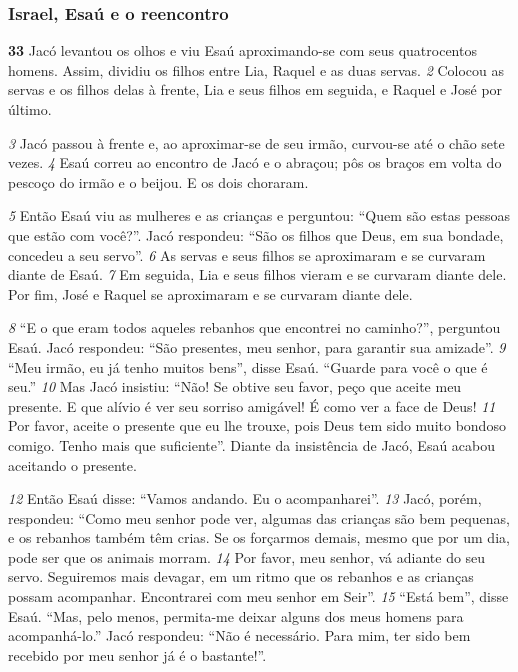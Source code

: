 \bigskip   
\subsubsection*{Israel, Esaú e o reencontro}
\textbf{\large 33}
 Jacó levantou os olhos e viu Esaú aproximando-se com seus quatrocentos
homens. Assim, dividiu os filhos entre Lia, Raquel e as duas servas. 
\textit{\tiny 2} 
Colocou as
servas e os filhos delas à frente, Lia e seus filhos em seguida, e Raquel e José por
último. 

\bigskip   
\textit{\tiny 3} 
Jacó passou à frente e, ao aproximar-se de seu irmão, curvou-se até o
chão sete vezes. 
\textit{\tiny 4} 
Esaú correu ao encontro de Jacó e o abraçou; pôs os braços em
volta do pescoço do irmão e o beijou. E os dois choraram.

\bigskip   
\textit{\tiny 5} 
Então   Esaú viu as mulheres e as crianças e perguntou: “Quem são estas
pessoas que estão com você?”.
   Jacó respondeu: “São os filhos que Deus, em sua bondade, concedeu a seu
servo”. 
\textit{\tiny 6} 
As servas e seus filhos se aproximaram e se curvaram diante de Esaú. 
\textit{\tiny 7} 
Em
seguida, Lia e seus filhos vieram e se curvaram diante dele. Por fim, José e Raquel
se aproximaram e se curvaram diante dele.

\bigskip   
\textit{\tiny 8} 
“E o que eram todos aqueles rebanhos que encontrei no caminho?”, perguntou
Esaú.
   Jacó respondeu: “São presentes, meu senhor, para garantir sua amizade”.
\textit{\tiny 9} 
“Meu irmão, eu já tenho muitos bens”, disse Esaú. “Guarde para você o que é
seu.”
\textit{\tiny 10}
Mas Jacó insistiu: “Não! Se obtive seu favor, peço que aceite meu presente. E
que alívio é ver seu sorriso amigável! É como ver a face de Deus! 
\textit{\tiny 11}
Por favor, aceite
o presente que eu lhe trouxe, pois Deus tem sido muito bondoso comigo. Tenho
mais que suficiente”. Diante da insistência de Jacó, Esaú acabou aceitando o
presente.
   
\bigskip   
\textit{\tiny 12}
Então Esaú disse: “Vamos andando. Eu o acompanharei”.
\textit{\tiny 13}
Jacó, porém, respondeu: “Como meu senhor pode ver, algumas das crianças
são bem pequenas, e os rebanhos também têm crias. Se os forçarmos demais,
mesmo que por um dia, pode ser que os animais morram. 
\textit{\tiny 14}
Por favor, meu
senhor, vá adiante do seu servo. Seguiremos mais devagar, em um ritmo que os
rebanhos e as crianças possam acompanhar. Encontrarei com meu senhor em
Seir”.
\textit{\tiny 15}
“Está bem”, disse Esaú. “Mas, pelo menos, permita-me deixar alguns dos
meus homens para acompanhá-lo.”
   Jacó respondeu: “Não é necessário. Para mim, ter sido bem recebido por meu
senhor já é o bastante!”.

